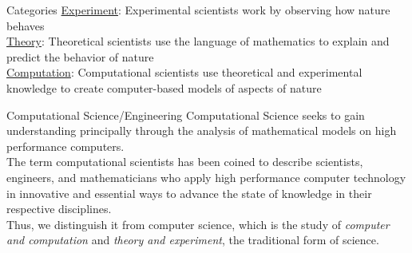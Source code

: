 \documentclass[xcolor=x11names,compress]{beamer}
\renewcommand{\(}{\begin{columns}}
\renewcommand{\)}{\end{columns}}
\newcommand{\<}[1]{\begin{column}{#1}}
\renewcommand{\>}{\end{column}}
\begin{document}
\begin{frame}{Categories}
\underline{Experiment}: Experimental scientists work by observing how nature behaves\\
\vspace*{0.25 in}
\underline{Theory}: Theoretical scientists use the language of mathematics to explain and predict the behavior of nature\\
\vspace*{0.25 in}
\underline{Computation}: Computational scientists use theoretical and experimental knowledge to create computer-based models of aspects of nature
\end{frame}

\begin{frame}{Computational Science/Engineering}
\textcolor{dgreen}{Computational Science} seeks to gain understanding principally through the analysis of mathematical models on high performance computers.\\
\vspace*{0.25 in}
The term \textcolor{dgreen}{computational scientists} has been coined to describe scientists, engineers, and mathematicians who apply high performance computer technology in innovative and essential ways to advance the state of knowledge in their respective disciplines.\\
\vspace*{0.25 in}
Thus, we distinguish it from \textcolor{dgreen}{computer science}, which is the study of \emph{computer and computation} and \emph{theory and experiment}, the traditional form of science. 
\end{frame}

\end{document}
